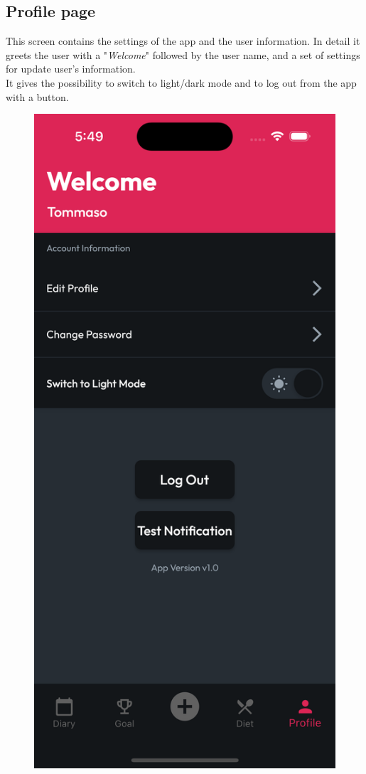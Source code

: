 \documentclass{Configuration_Files/PoliMi3i_thesis}
\begin{document}
\subsection{Profile page}

\begin{minipage}{\linewidth}
    This screen contains the settings of the app and the user information.
    In detail it greets the user with a "\emph{Welcome}" followed by the user name, and a set of settings for update user's information.\\
    It gives the possibility to switch to light/dark mode and to log out from the app with a button.
\end{minipage}

\begin{figure}[!h]
  \centering
  \includegraphics[scale=0.1]{Images/Screenshots/Mobile/Profile.png}

\end{figure}
\end{document}

